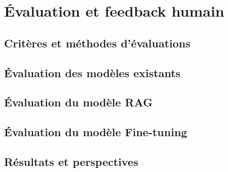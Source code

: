 
\chapter{Évaluation et feedback humain} %

\label{ch:3} %

\section{Critères et méthodes d'évaluations}
\section{Évaluation des modèles existants}
\section{Évaluation du modèle RAG}
\section{Évaluation du modèle Fine-tuning}
\section{Résultats et perspectives}
